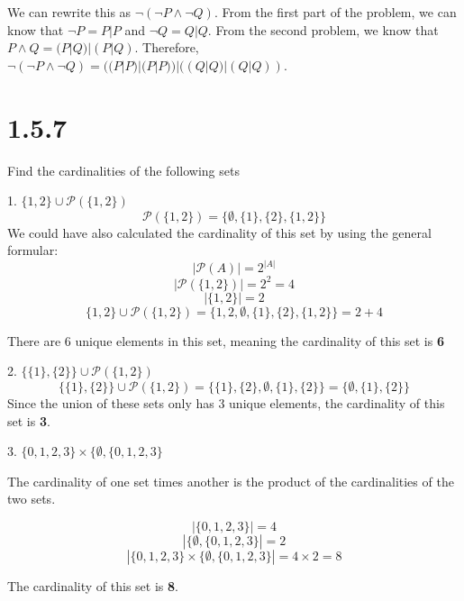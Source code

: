 \documentclass[hidelinks]{article}
\begin{document}
\vspace{0.2cm}
We can rewrite this as $\neg(\neg P \wedge \neg Q)$. From the first part of the problem, we can know that $\neg P = P|P$ and $\neg Q = Q|Q$. From the second problem, we know that $P \wedge Q = (P|Q)|(P|Q)$. Therefore, $\neg(\neg P \wedge \neg Q) = ((P|P)|(P|P))|((Q|Q)|(Q|Q))$.
\newpage
\section{1.5.7}
Find the cardinalities of the following sets 

1. $\{1, 2\} \cup \mathcal{P}(\{1, 2\})$
\[
    \mathcal{P}(\{1, 2\}) = \{\emptyset, \{1\}, \{2\}, \{1,2\}\}
\]
We could have also calculated the cardinality of this set by using the general formular: 
\[
    |\mathcal{P}(A)| = 2^{|A|}
\]
\[
    |\mathcal{P}(\{1, 2\})| = 2^2 = 4
\]
\[
    |\{1,2\}| = 2
\]
\[
    \{1, 2\} \cup \mathcal{P}(\{1, 2\}) = \{1, 2, \emptyset, \{1\}, \{2\}, \{1,2\}\} = 2 + 4
\]

There are 6 unique elements in this set, meaning the cardinality of this set is \textbf{6}

2. $\{\{1\}, \{2\}\} \cup \mathcal{P}(\{1, 2\})$
\[
    \{\{1\}, \{2\}\} \cup \mathcal{P}(\{1, 2\}) = \{\{1\},\{2\},\emptyset, \{1\},\{2\}\} = \{\emptyset, \{1\},\{2\}\}
\]
Since the union of these sets only has 3 unique elements, the cardinality of this set is \textbf{3}.

3. $\{0,1,2,3\} \times \{\emptyset, \{0,1,2,3\}$ 

The cardinality of one set times another is the product of the cardinalities of the two sets.

\[
    |\{0,1,2,3\}| = 4
\]
\[
    |\{\emptyset, \{0,1,2,3\}| = 2
\]
\[
    |\{0,1,2,3\} \times \{\emptyset, \{0,1,2,3\}| = 4 \times 2 = 8
\]

The cardinality of this set is \textbf{8}.
\end{document}
